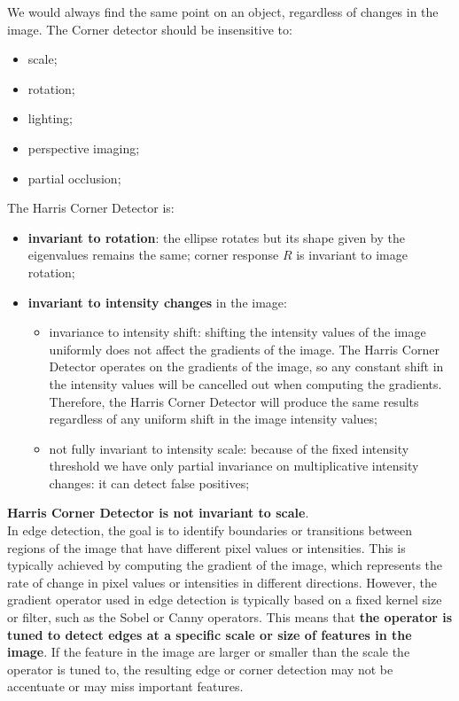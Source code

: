 \documentclass{article}
\begin{document}
We would always find the same point on an object, regardless of changes in the image. The Corner detector should be insensitive to:

\begin{itemize}
    \item scale;
    \item rotation;
    \item lighting;
    \item perspective imaging;
    \item partial occlusion;
\end{itemize}

The Harris Corner Detector is:
\begin{itemize}
    \item \textbf{invariant to rotation}: the ellipse rotates but its shape given by the eigenvalues remains the same; corner response $R$ is invariant to image rotation;
    \item \textbf{invariant to intensity changes} in the image: 
    \begin{itemize}
        \item invariance to intensity shift: shifting the intensity values of the image uniformly does not affect the gradients of the image. The Harris Corner Detector operates on the gradients of the image, so any constant shift in the intensity values will be cancelled out when computing the gradients. Therefore, the Harris Corner Detector will produce the same results regardless of any uniform shift in the image intensity values;
        \item not fully invariant to intensity scale: because of the fixed intensity threshold we have only partial invariance on multiplicative intensity changes: it can detect false positives;
    \end{itemize}
\end{itemize}

\textbf{Harris Corner Detector is not invariant to scale}. \\

In edge detection, the goal is to identify boundaries or transitions between regions of the image that have different pixel values or intensities. This is typically achieved by computing the gradient of the image, which represents the rate of change in pixel values or intensities in different directions. However, the gradient operator used in edge detection is typically based on a fixed kernel size or filter, such as the Sobel or Canny operators. This means that \textbf{the operator is tuned to detect edges at a specific scale or size of features in the image}. If the feature in the image are larger or smaller than the scale the operator is tuned to, the resulting edge or corner detection may not be accentuate or may miss important features. \\
\end{document}
